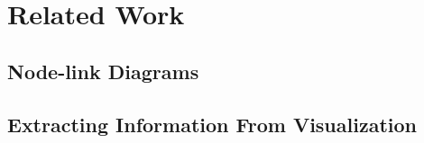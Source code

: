 \section{Related Work}\label{sec:relatedwork}
\subsection{Node-link Diagrams}
\subsection{Extracting Information From Visualization}



